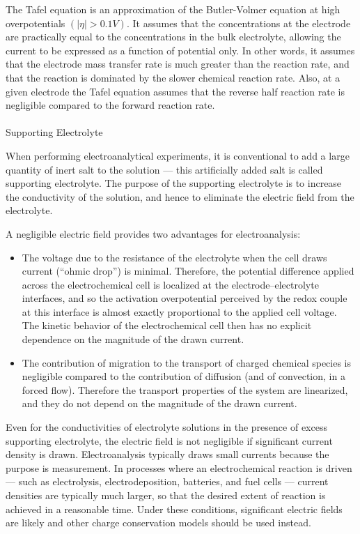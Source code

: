 \documentclass[
  letterpaper,
  DIV=11,
  numbers=noendperiod]{scrartcl}
\makeatletter
\let\oldparagraph\paragraph
\renewcommand{\paragraph}{
    \@ifstar
      \xxxParagraphStar
      \xxxParagraphNoStar
  }
\newcommand{\xxxParagraphStar}[1]{\oldparagraph*{#1}\mbox{}}
\newcommand{\xxxParagraphNoStar}[1]{\oldparagraph{#1}\mbox{}}
\providecommand{\tightlist}{%
  \setlength{\itemsep}{0pt}\setlength{\parskip}{0pt}}
\makeatother
\begin{document}
The Tafel equation is an approximation of the Butler-Volmer equation at
high overpotentials \((\lvert\eta\rvert > 0.1 V)\). It assumes that the
concentrations at the electrode are practically equal to the
concentrations in the bulk electrolyte, allowing the current to be
expressed as a function of potential only. In other words, it assumes
that the electrode mass transfer rate is much greater than the reaction
rate, and that the reaction is dominated by the slower chemical reaction
rate. Also, at a given electrode the Tafel equation assumes that the
reverse half reaction rate is negligible compared to the forward
reaction rate.

\paragraph{Supporting Electrolyte}\label{supporting-electrolyte}

When performing electroanalytical experiments, it is conventional to add
a large quantity of inert salt to the solution --- this artificially
added salt is called supporting electrolyte. The purpose of the
supporting electrolyte is to increase the conductivity of the solution,
and hence to eliminate the electric field from the electrolyte.

A negligible electric field provides two advantages for electroanalysis:

\begin{itemize}
\tightlist
\item
  The voltage due to the resistance of the electrolyte when the cell
  draws current (``ohmic drop'') is minimal. Therefore, the potential
  difference applied across the electrochemical cell is localized at the
  electrode--electrolyte interfaces, and so the activation overpotential
  perceived by the redox couple at this interface is almost exactly
  proportional to the applied cell voltage. The kinetic behavior of the
  electrochemical cell then has no explicit dependence on the magnitude
  of the drawn current.
\item
  The contribution of migration to the transport of charged chemical
  species is negligible compared to the contribution of diffusion (and
  of convection, in a forced flow). Therefore the transport properties
  of the system are linearized, and they do not depend on the magnitude
  of the drawn current.
\end{itemize}

Even for the conductivities of electrolyte solutions in the presence of
excess supporting electrolyte, the electric field is not negligible if
significant current density is drawn. Electroanalysis typically draws
small currents because the purpose is measurement. In processes where an
electrochemical reaction is driven --- such as electrolysis,
electrodeposition, batteries, and fuel cells --- current densities are
typically much larger, so that the desired extent of reaction is
achieved in a reasonable time. Under these conditions, significant
electric fields are likely and other charge conservation models should
be used instead.
\end{document}
